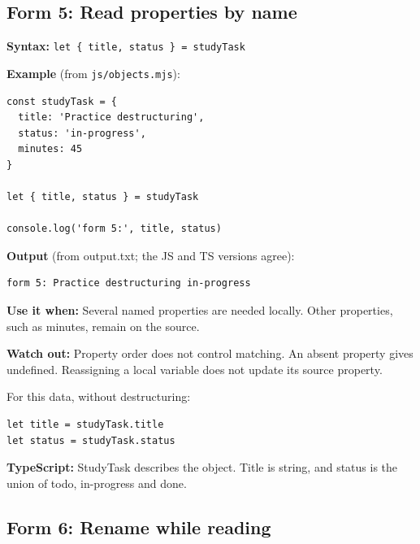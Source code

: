\documentclass[10pt,a4paper]{article}
\begin{document}
\subsection{Form 5: Read properties by name}

\textbf{Syntax:} \texttt{let \{ title,\allowbreak{} status \} =\allowbreak{} study\allowbreak{}Task}


\textbf{Example} (from \texttt{js/\allowbreak{}objects.\allowbreak{}mjs}):

\begin{lstlisting}[language=GuideJS]
const studyTask = {
  title: 'Practice destructuring',
  status: 'in-progress',
  minutes: 45
}

let { title, status } = studyTask

console.log('form 5:', title, status)
\end{lstlisting}


\textbf{Output} (from output.txt; the JS and TS versions agree):

\begin{lstlisting}[language={}]
form 5: Practice destructuring in-progress
\end{lstlisting}

\textbf{Use it when:} Several named properties are needed locally. Other properties, such as minutes, remain on the source.

\textbf{Watch out:} Property order does not control matching. An absent property gives undefined. Reassigning a local variable does not update its source property.


For this data, without destructuring:

\begin{lstlisting}[language=GuideJS]
let title = studyTask.title
let status = studyTask.status
\end{lstlisting}

\textbf{TypeScript:} StudyTask describes the object. Title is string, and status is the union of todo, in-progress and done.

\subsection{Form 6: Rename while reading}
\end{document}
